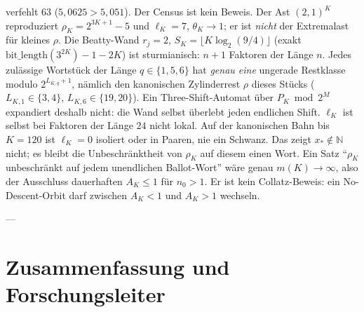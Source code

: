\documentclass[11pt,reqno]{amsart}
\theoremstyle{definition}
\theoremstyle{remark}
\numberwithin{equation}{section}
\begin{document}
verfehlt $63$ ($5{,}0625>5{,}051$).
Der Census ist kein Beweis.
Der Ast $(2,1)^K$ reproduziert $\rho_K=2^{3K+1}-5$ und $\ell_K=7$, $\theta_K\to 1$; er ist \emph{nicht} der Extremalast für kleines $\rho$.
Die Beatty-Wand $r_j=2$, $S_K=\lfloor K\log_2(9/4)\rfloor$ (exakt $\mathrm{bit\_length}(3^{2K})-1-2K$) ist sturmianisch: $n+1$ Faktoren der Länge $n$.
Jedes zulässige Wortstück der Länge $q\in\{1,5,6\}$ hat \emph{genau eine} ungerade Restklasse modulo $2^{L_{K,q}+1}$, nämlich den kanonischen Zylinderrest $\rho$ dieses Stücks ($L_{K,1}\in\{3,4\}$, $L_{K,6}\in\{19,20\}$).
Ein Three-Shift-Automat über $P_K\bmod 2^M$ expandiert deshalb nicht: die Wand selbst überlebt jeden endlichen Shift.
$\ell_K$ ist selbst bei Faktoren der Länge $24$ nicht lokal. Auf der kanonischen Bahn bis $K=120$ ist $\ell_K=0$ isoliert oder in Paaren, nie ein Schwanz. Das zeigt $x_*\notin\mathbb{N}$ nicht; es bleibt die Unbeschränktheit von $\rho_K$ auf diesem einen Wort.
Ein Satz ``$\rho_K$ unbeschränkt auf jedem unendlichen Ballot-Wort'' wäre genau $m(K)\to\infty$, also der Ausschluss dauerhaften $A_K\le 1$ für $n_0>1$.
Er ist kein Collatz-Beweis: ein No-Descent-Orbit darf zwischen $A_K<1$ und $A_K>1$ wechseln.

---

\section{Zusammenfassung und Forschungsleiter}
\end{document}
